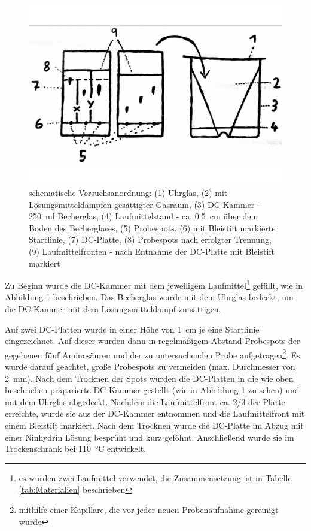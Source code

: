 \documentclass{article}
\begin{document}
        \begin{figure}[H]
          \includegraphics[scale=0.08, center]{Graphiken/Versuchsanordnungen/VersuchsanordnungDC.png} 
          \caption[schematische Versuchsanordnung Dünnschichtchromatographie, Quelle: Autor]{schematische Versuchsanordnung: (1) Uhrglas, (2) mit Lösungsmitteldämpfen gesättigter Gasraum, (3) DC-Kammer - \SI[mode=text,separate-uncertainty=true]{250}{\milli\litre} Becherglas, (4) Laufmittelstand - ca. \SI[mode=text]{0.5}{\centi\meter} über dem Boden des Becherglases, (5) Probespots, (6) mit Bleistift markierte Startlinie, (7) DC-Platte, (8) Probespots nach erfolgter Trennung, (9) Laufmittelfronten - nach Entnahme der DC-Platte mit Bleistift markiert}
          \label{fig:Versuchsanordnung}
        \end{figure}
    
        Zu Beginn wurde die DC-Kammer mit dem jeweiligem Laufmittel\footnote{es wurden zwei Laufmittel verwendet, die Zusammensetzung ist in Tabelle \ref{tab:Materialien} beschrieben} gefüllt, wie in Abbildung \ref{fig:Versuchsanordnung} beschrieben. Das Becherglas wurde mit dem Uhrglas bedeckt, um die DC-Kammer mit dem Lösungsmitteldampf zu sättigen. 
        
        Auf zwei DC-Platten wurde in einer Höhe von \SI[mode=text]{1}{\centi\meter} je eine Startlinie eingezeichnet. Auf dieser wurden dann in regelmäßigem Abstand Probespots der gegebenen fünf Aminosäuren und der zu untersuchenden Probe aufgetragen\footnote{mithilfe einer Kapillare, die vor jeder neuen Probenaufnahme gereinigt wurde}. Es wurde darauf geachtet, große Probespots zu vermeiden (max. Durchmesser von \SI[mode=text]{2}{\milli\meter}). Nach dem Trocknen der Spots wurden die DC-Platten in die wie oben beschrieben präparierte DC-Kammer gestellt (wie in Abbildung \ref{fig:Versuchsanordnung} zu sehen) und mit dem Uhrglas abgedeckt. Nachdem die Laufmittelfront ca. 2/3 der Platte erreichte, wurde sie aus der DC-Kammer entnommen und die Laufmittelfront mit einem Bleistift markiert. Nach dem Trocknen wurde die DC-Platte im Abzug mit einer Ninhydrin Lösung besprüht und kurz geföhnt. Anschließend wurde sie im Trockenschrank bei \SI[mode=text]{110}{\degreeCelsius} entwickelt.
    
\end{document}
